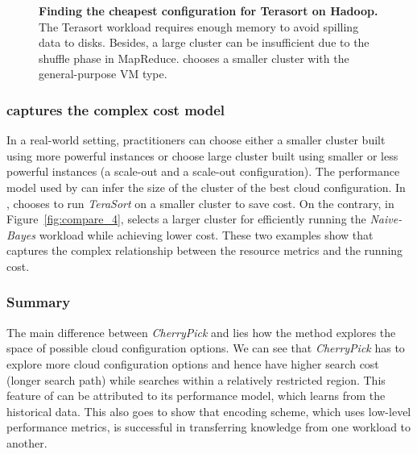 \begin{figure}[!htbp]
\begin{subfigure}[b]{0.4\textwidth}
    \caption{\scout}
    \label{fig:search_cost_scout}
\end{subfigure}
\caption{\small{\textbf{Finding the cheapest configuration for Terasort on Hadoop.} The Terasort workload requires enough memory to avoid spilling data to disks. Besides, a large cluster can be insufficient due to the shuffle phase in MapReduce.  \scout chooses a smaller cluster with the general-purpose VM type. }}
\label{fig:compare_3}
\end{figure}



\subsubsection*{\scout captures the complex cost model}
In a real-world setting, practitioners can choose either a smaller cluster built using more powerful instances or choose large cluster built using smaller or less powerful instances (a scale-out and a scale-out configuration). The performance model used by \scout can infer the size of the cluster of the best cloud configuration.
In \myfigure{\ref{fig:compare_3}}, \scout chooses to run \emph{TeraSort} on a smaller cluster to save cost. On the contrary, in Figure~\ref{fig:compare_4}, \scout selects a larger cluster for efficiently running the \emph{Naive-Bayes} workload while achieving lower cost. These two examples show that \scout captures the complex relationship between the resource metrics and the running cost.


\subsubsection*{Summary}
The main difference between \emph{CherryPick} and \scout lies how the method explores the space of possible cloud configuration options. We can see that \emph{CherryPick} has to explore more cloud configuration options and hence have higher search cost (longer search path) while \scout searches within a relatively restricted region. This feature of \scout can be attributed to its performance model, which learns from the historical data. This also goes to show that encoding scheme, which uses low-level performance metrics, is successful in transferring knowledge from one workload to another.


